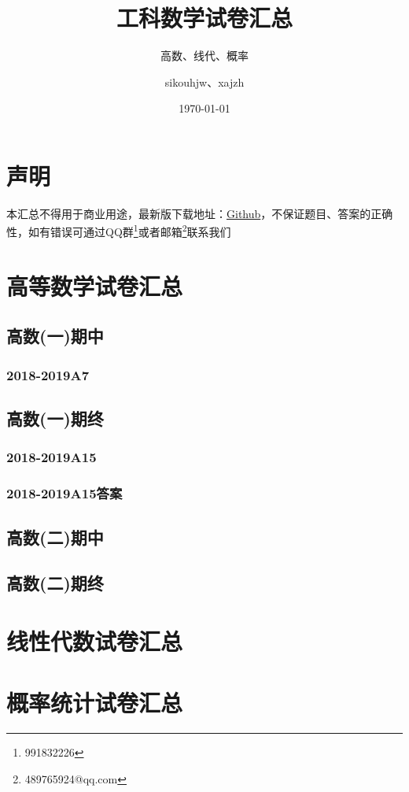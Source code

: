 \documentclass[cn,11pt,fancy,hide]{elegantbook}
\title{工科数学试卷汇总}
\subtitle{高数、线代、概率}
\author{sikouhjw、xajzh}
\institute{临时组织起来的重排小组}
\date{\today}
\begin{document}
\maketitle
\tableofcontents


\mainmatter
\hypersetup{pageanchor=true}
\chapter{声明}
本汇总不得用于商业用途，最新版下载地址：\href{https://github.com/sikouhjw/LaTeX-learning-notes/tree/master/%E9%AB%98%E6%95%B0+%E7%BA%BF%E4%BB%A3+%E6%A6%82%E7%8E%87%E9%87%8D%E6%8E%92}{Github}，不保证题目、答案的正确性，如有错误可通过QQ群\footnote{991832226}或者邮箱\footnote{489765924@qq.com}联系我们

\chapter{高等数学试卷汇总}
\section{高数(一)期中}
\subsection{2018-2019A7}

\section{高数(一)期终}
\subsection{2018-2019A15}
\subsection{2018-2019A15答案}
\section{高数(二)期中}
\section{高数(二)期终}

\chapter{线性代数试卷汇总}

\chapter{概率统计试卷汇总}
\end{document}
